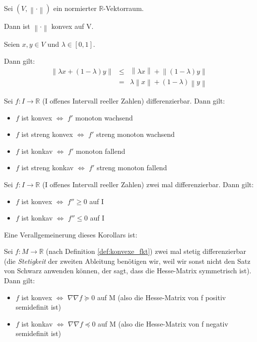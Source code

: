 \documentclass[10pt]{scrbook}
\begin{document}
\begin{Bsp}
Sei $(V, \left\|\cdot\right\|)$ ein normierter $\mathbb{R}$-Vektorraum.

Dann ist $\left\|\cdot\right\|$ konvex auf V.
\end{Bsp}
\begin{bew}
Seien $x, y\in V$ und $\lambda \in [0, 1]$.

Dann gilt:
\begin{eqnarray*}
\left\|\lambda x+(1-\lambda) y\right\| & \leq & \left\|\lambda x\right\|+\left\|(1-\lambda) y\right\| \\
& = & \lambda \left\|x\right\|+(1-\lambda) \left\|y\right\|
\end{eqnarray*}
\end{bew}

\begin{Sa}
Sei $f: I\rightarrow \mathbb{R}$ (I offenes Intervall reeller Zahlen) differenzierbar. Dann gilt:
\begin{itemize}
\item $f$ ist konvex $\Leftrightarrow$ $f'$ monoton wachsend
\item $f$ ist streng konvex $\Leftrightarrow$ $f'$ streng monoton wachsend
\item $f$ ist konkav $\Leftrightarrow$ $f'$ monoton fallend
\item $f$ ist streng konkav $\Leftrightarrow$ $f'$ streng monoton fallend
\end{itemize}
\end{Sa}

\begin{Kor}
Sei $f: I\rightarrow \mathbb{R}$ (I offenes Intervall reeller Zahlen) zwei mal differenzierbar. Dann gilt:
\begin{itemize}
\item $f$ ist konvex $\Leftrightarrow$ $f''\geq 0$ auf I
\item $f$ ist konkav $\Leftrightarrow$ $f''\leq 0$ auf I
\end{itemize}
\end{Kor}

Eine Verallgemeinerung dieses Korollars ist:

\begin{Sa}
Sei $f: M\rightarrow \mathbb{R}$ (nach Definition \ref{def:konvexe_fkt}) zwei mal stetig differenzierbar (die \emph{Stetigkeit} der zweiten Ableitung benötigen wir, weil wir sonst nicht den Satz von Schwarz anwenden können, der sagt, dass die Hesse-Matrix symmetrisch ist). Dann gilt:
\begin{itemize}
\item $f$ ist konvex $\Leftrightarrow$ $\nabla \nabla f\succeq 0$ auf M (also die Hesse-Matrix von f positiv semidefinit ist)
\item $f$ ist konkav $\Leftrightarrow$ $\nabla \nabla f\preceq 0$ auf M (also die Hesse-Matrix von f negativ semidefinit ist)
\end{itemize}
\end{Sa}
\end{document}

